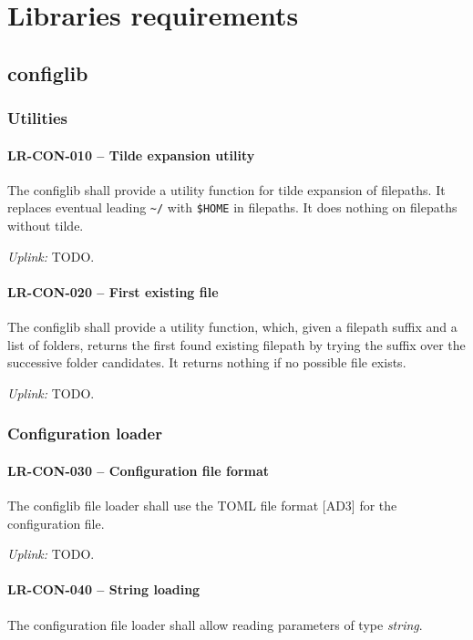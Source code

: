 \section{Libraries requirements}
\subsection{config\textunderscore lib}
\subsubsection{Utilities}
\paragraph{LR-CON-010 -- Tilde expansion utility}
The config\textunderscore lib shall provide a utility function for tilde
expansion of filepaths. It replaces eventual leading \lstinline{~/}
with \lstinline{$HOME} in filepaths. It does nothing on filepaths
without tilde.

\textit{Uplink: } TODO.

\paragraph{LR-CON-020 -- First existing file}
The config\textunderscore lib shall provide a utility function, which,
given a filepath suffix and a list of folders, returns the first found
existing filepath by trying the suffix over the successive folder
candidates. It returns nothing if no possible file exists.

\textit{Uplink: } TODO.

\subsubsection{Configuration loader}
\paragraph{LR-CON-030 -- Configuration file format}
The config\textunderscore lib file loader shall use the TOML file format [AD3]
for the configuration file.

\textit{Uplink: } TODO.

\paragraph{LR-CON-040 -- String loading}
The configuration file loader shall allow reading parameters of type
\emph{string}.

